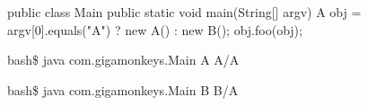 \begin{lrbox}{\chonesixtwo}
  \begin{minipage}{\linewidth}
\begin{myverb}
public class Main {
  public static void main(String[] argv) {
    A obj = argv[0].equals("A") ? new A() : new B();
    obj.foo(obj);
  }
}
\end{myverb}
  \end{minipage}
\end{lrbox}

\begin{lrbox}{\chonesixthree}
  \begin{minipage}{\linewidth}
\begin{myverb}
bash\$ java com.gigamonkeys.Main A
A/A
\end{myverb}
  \end{minipage}
\end{lrbox}

\begin{lrbox}{\chonesixfour}
  \begin{minipage}{\linewidth}
\begin{myverb}
bash\$ java com.gigamonkeys.Main B
B/A
\end{myverb}
  \end{minipage}
\end{lrbox}


